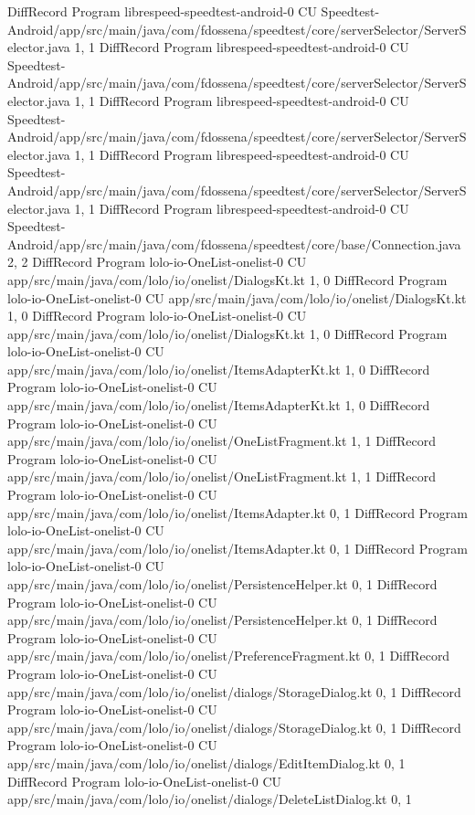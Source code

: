DiffRecord Program librespeed-speedtest-android-0 CU Speedtest-Android/app/src/main/java/com/fdossena/speedtest/core/serverSelector/ServerSelector.java  {1, 1}
DiffRecord Program librespeed-speedtest-android-0 CU Speedtest-Android/app/src/main/java/com/fdossena/speedtest/core/serverSelector/ServerSelector.java  {1, 1}
DiffRecord Program librespeed-speedtest-android-0 CU Speedtest-Android/app/src/main/java/com/fdossena/speedtest/core/serverSelector/ServerSelector.java  {1, 1}
DiffRecord Program librespeed-speedtest-android-0 CU Speedtest-Android/app/src/main/java/com/fdossena/speedtest/core/serverSelector/ServerSelector.java  {1, 1}
DiffRecord Program librespeed-speedtest-android-0 CU Speedtest-Android/app/src/main/java/com/fdossena/speedtest/core/base/Connection.java  {2, 2}
DiffRecord Program lolo-io-OneList-onelist-0 CU app/src/main/java/com/lolo/io/onelist/DialogsKt.kt  {1, 0}
DiffRecord Program lolo-io-OneList-onelist-0 CU app/src/main/java/com/lolo/io/onelist/DialogsKt.kt  {1, 0}
DiffRecord Program lolo-io-OneList-onelist-0 CU app/src/main/java/com/lolo/io/onelist/DialogsKt.kt  {1, 0}
DiffRecord Program lolo-io-OneList-onelist-0 CU app/src/main/java/com/lolo/io/onelist/ItemsAdapterKt.kt  {1, 0}
DiffRecord Program lolo-io-OneList-onelist-0 CU app/src/main/java/com/lolo/io/onelist/ItemsAdapterKt.kt  {1, 0}
DiffRecord Program lolo-io-OneList-onelist-0 CU app/src/main/java/com/lolo/io/onelist/OneListFragment.kt  {1, 1}
DiffRecord Program lolo-io-OneList-onelist-0 CU app/src/main/java/com/lolo/io/onelist/OneListFragment.kt  {1, 1}
DiffRecord Program lolo-io-OneList-onelist-0 CU app/src/main/java/com/lolo/io/onelist/ItemsAdapter.kt  {0, 1}
DiffRecord Program lolo-io-OneList-onelist-0 CU app/src/main/java/com/lolo/io/onelist/ItemsAdapter.kt  {0, 1}
DiffRecord Program lolo-io-OneList-onelist-0 CU app/src/main/java/com/lolo/io/onelist/PersistenceHelper.kt  {0, 1}
DiffRecord Program lolo-io-OneList-onelist-0 CU app/src/main/java/com/lolo/io/onelist/PersistenceHelper.kt  {0, 1}
DiffRecord Program lolo-io-OneList-onelist-0 CU app/src/main/java/com/lolo/io/onelist/PreferenceFragment.kt  {0, 1}
DiffRecord Program lolo-io-OneList-onelist-0 CU app/src/main/java/com/lolo/io/onelist/dialogs/StorageDialog.kt  {0, 1}
DiffRecord Program lolo-io-OneList-onelist-0 CU app/src/main/java/com/lolo/io/onelist/dialogs/StorageDialog.kt  {0, 1}
DiffRecord Program lolo-io-OneList-onelist-0 CU app/src/main/java/com/lolo/io/onelist/dialogs/EditItemDialog.kt  {0, 1}
DiffRecord Program lolo-io-OneList-onelist-0 CU app/src/main/java/com/lolo/io/onelist/dialogs/DeleteListDialog.kt  {0, 1}
